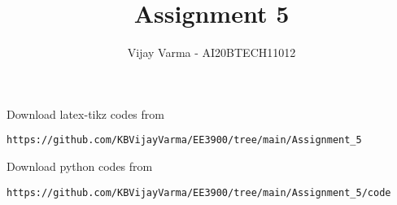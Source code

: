 \documentclass[journal,12pt,twocolumn]{IEEEtran}
\DeclareMathOperator*{\Res}{Res}
\begin{document}
\newcommand{\BEQA}{\begin{eqnarray}}
\newcommand{\EEQA}{\end{eqnarray}}
\newcommand{\define}{\stackrel{\triangle}{=}}

\raggedbottom
\setlength{\parindent}{0pt}
\providecommand{\mbf}{\mathbf}
\providecommand{\pr}[1]{\ensuremath{\Pr\left(#1\right)}}
\providecommand{\qfunc}[1]{\ensuremath{Q\left(#1\right)}}
\providecommand{\sbrak}[1]{\ensuremath{{}\left[#1\right]}}
\providecommand{\lsbrak}[1]{\ensuremath{{}\left[#1\right.}}
\providecommand{\rsbrak}[1]{\ensuremath{{}\left.#1\right]}}
\providecommand{\brak}[1]{\ensuremath{\left(#1\right)}}
\providecommand{\lbrak}[1]{\ensuremath{\left(#1\right.}}
\providecommand{\rbrak}[1]{\ensuremath{\left.#1\right)}}
\providecommand{\cbrak}[1]{\ensuremath{\left\{#1\right\}}}
\providecommand{\lcbrak}[1]{\ensuremath{\left\{#1\right.}}
\providecommand{\rcbrak}[1]{\ensuremath{\left.#1\right\}}}
\theoremstyle{remark}
\newtheorem{rem}{Remark}
\newcommand{\sgn}{\mathop{\mathrm{sgn}}}
\providecommand{\abs}[1]{\vert#1\vert}
\providecommand{\res}[1]{\Res\displaylimits_{#1}} 
\providecommand{\norm}[1]{\lVert#1\rVert}
\providecommand{\mtx}[1]{\mathbf{#1}}
\providecommand{\mean}[1]{E[ #1 ]}
\providecommand{\fourier}{\overset{\mathcal{F}}{ \rightleftharpoons}}
\providecommand{\system}{\overset{\mathcal{H}}{ \longleftrightarrow}}
\newcommand{\solution}{\noindent \textbf{Solution: }}
\newcommand{\cosec}{\,\text{cosec}\,}
\providecommand{\dec}[2]{\ensuremath{\overset{#1}{\underset{#2}{\gtrless}}}}
\newcommand{\myvec}[1]{\ensuremath{\begin{pmatrix}#1\end{pmatrix}}}
\newcommand{\mydet}[1]{\ensuremath{\begin{vmatrix}#1\end{vmatrix}}}
\makeatletter
{}
\makeatother
\let\StandardTheFigure\thefigure
\let\vec\mathbf
\renewcommand{\thefigure}{\theproblem}
\def\putbox#1#2#3{\makebox[0in][l]{\makebox[#1][l]{}\raisebox{\baselineskip}[0in][0in]{\raisebox{#2}[0in][0in]{#3}}}}
     \def\rightbox#1{\makebox[0in][r]{#1}}
     \def\centbox#1{\makebox[0in]{#1}}
     \def\topbox#1{\raisebox{-\baselineskip}[0in][0in]{#1}}
     \def\midbox#1{\raisebox{-0.5\baselineskip}[0in][0in]{#1}}
\vspace{3cm}
\title{Assignment 5}
\author{Vijay Varma - AI20BTECH11012}
\maketitle
\newpage
\bigskip
\renewcommand{\thefigure}{\theenumi}
\renewcommand{\thetable}{\theenumi}
%
Download latex-tikz codes from 
%
\begin{lstlisting}
https://github.com/KBVijayVarma/EE3900/tree/main/Assignment_5
\end{lstlisting}
%
Download python codes from 
%
\begin{lstlisting}
https://github.com/KBVijayVarma/EE3900/tree/main/Assignment_5/code
\end{lstlisting}
\end{document}
